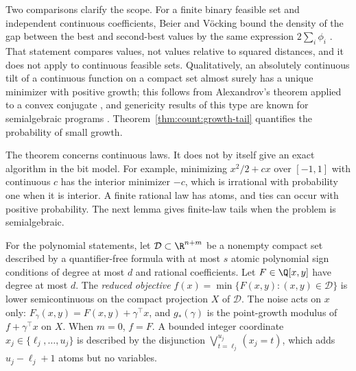 Two comparisons clarify the scope. For a finite binary feasible set and
independent continuous coefficients, Beier and V\"ocking bound the density of
the gap between the best and second-best values by the same expression
$2\sum_i\phi_i$ \cite{beier2006-typical-properties-of-winners-and}. That
statement compares values, not values relative to squared distances, and it
does not apply to continuous feasible sets. Qualitatively, an absolutely
continuous tilt of a continuous function on a compact set almost surely has
a unique minimizer with positive growth; this follows from Alexandrov's
theorem applied to a convex conjugate \cite{azagra2023-a-geometric-approach-to-second},
and genericity results of this type are known for semialgebraic programs
\cite{lee2016-stability-and-genericity-for-semi}. Theorem~\ref{thm:count:growth-tail}
quantifies the probability of small growth.

The theorem concerns continuous laws. It does not by itself give an exact
algorithm in the bit model. For example, minimizing $x^2/2+cx$ over $[-1,1]$
with continuous $c$ has the interior minimizer $-c$, which is irrational with
probability one when it is interior. A finite rational law has atoms, and
ties can occur with positive probability. The next lemma gives finite-law
tails when the problem is semialgebraic.

For the polynomial statements, let $\mathcal D\subset\R^{n+m}$ be a nonempty
compact set described by a quantifier-free formula with at most $s$ atomic
polynomial sign conditions of degree at most $d$ and rational coefficients.
Let $F\in\Q[x,y]$ have degree at most $d$. The \emph{reduced objective}
$f(x)=\min\{F(x,y):(x,y)\in\mathcal D\}$ is lower semicontinuous on the
compact projection $X$ of $\mathcal D$. The noise acts on $x$ only:
$F_\gamma(x,y)=F(x,y)+\gamma^\top x$, and $g_*(\gamma)$ is the point-growth
modulus of $f+\gamma^\top x$ on $X$. When $m=0$, $f=F$. A bounded integer
coordinate $x_j\in\{\ell_j,\dots,u_j\}$ is described by the disjunction
$\bigvee_{t=\ell_j}^{u_j}(x_j=t)$, which adds $u_j-\ell_j+1$ atoms but no
variables.

